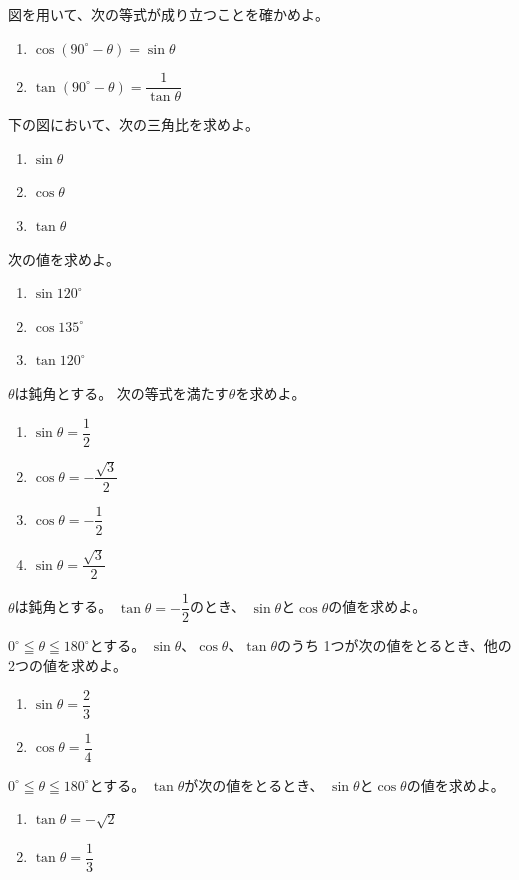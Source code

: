 \documentclass[a4paper, 10pt]{jarticle}
\begin{document}
図を用いて、次の等式が成り立つことを確かめよ。
\begin{enumerate}
  \item $\cos\left(90^\circ-\theta\right)=\sin\theta$
  \item $\tan\left(90^\circ-\theta\right)=\dfrac{1}{\tan\theta}$
\end{enumerate}

下の図において、次の三角比を求めよ。
\begin{enumerate}
  \item $\sin\theta$
  \item $\cos\theta$
  \item $\tan\theta$
\end{enumerate}

次の値を求めよ。
\begin{enumerate}
  \item $\sin120^\circ$
  \item $\cos135^\circ$
  \item $\tan120^\circ$
\end{enumerate}

$\theta$は鈍角とする。
次の等式を満たす$\theta$を求めよ。
\begin{enumerate}
  \item $\sin\theta=\dfrac{1}{2}$
  \item $\cos\theta=-\dfrac{\sqrt{3}}{2}$
  \item $\cos\theta=-\dfrac{1}{2}$
  \item $\sin\theta=\dfrac{\sqrt{3}}{2}$
\end{enumerate}

$\theta$は鈍角とする。
$\tan\theta=-\dfrac{1}{2}$のとき、
$\sin\theta$と$\cos\theta$の値を求めよ。

$0^\circ\leqq\theta\leqq180^\circ$とする。
$\sin\theta$、$\cos\theta$、$\tan\theta$のうち
1つが次の値をとるとき、他の2つの値を求めよ。
\begin{enumerate}
  \item $\sin\theta=\dfrac{2}{3}$
  \item $\cos\theta=\dfrac{1}{4}$
\end{enumerate}

$0^\circ\leqq\theta\leqq180^\circ$とする。
$\tan\theta$が次の値をとるとき、
$\sin\theta$と$\cos\theta$の値を求めよ。
\begin{enumerate}
  \item $\tan\theta=-\sqrt{2}$
  \item $\tan\theta=\dfrac{1}{3}$
\end{enumerate}
\end{document}

